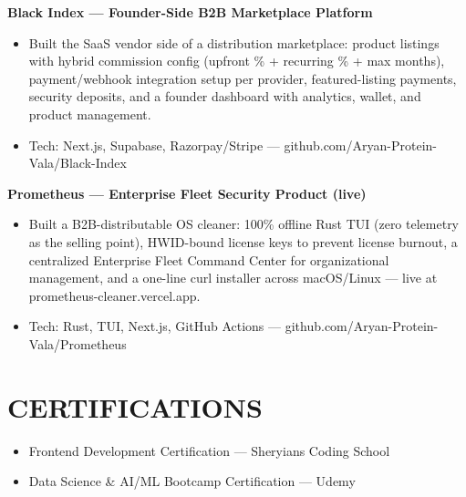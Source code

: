 \documentclass[9pt]{article}
\begin{document}
\textbf{Black Index  ---  Founder-Side B2B Marketplace Platform}
\vspace{1pt}
\begin{itemize}[leftmargin=11pt,itemsep=0pt,topsep=1pt,parsep=0pt]
\item Built the SaaS vendor side of a distribution marketplace: product listings with hybrid commission config (upfront \% + recurring \% + max months), payment/webhook integration setup per provider, featured-listing payments, security deposits, and a founder dashboard with analytics, wallet, and product management.
\item Tech: Next.js, Supabase, Razorpay/Stripe  ---  github.com/Aryan-Protein-Vala/Black-Index
\end{itemize}
\textbf{Prometheus  ---  Enterprise Fleet Security Product (live)}
\vspace{1pt}
\begin{itemize}[leftmargin=11pt,itemsep=0pt,topsep=1pt,parsep=0pt]
\item Built a B2B-distributable OS cleaner: 100\% offline Rust TUI (zero telemetry as the selling point), HWID-bound license keys to prevent license burnout, a centralized Enterprise Fleet Command Center for organizational management, and a one-line curl installer across macOS/Linux  ---  live at prometheus-cleaner.vercel.app.
\item Tech: Rust, TUI, Next.js, GitHub Actions  ---  github.com/Aryan-Protein-Vala/Prometheus
\end{itemize}
\section*{CERTIFICATIONS}
\begin{itemize}[leftmargin=11pt,itemsep=0pt,topsep=1pt,parsep=0pt]
\item Frontend Development Certification  ---  Sheryians Coding School
\item Data Science \& AI/ML Bootcamp Certification  ---  Udemy
\end{itemize}
\end{document}
